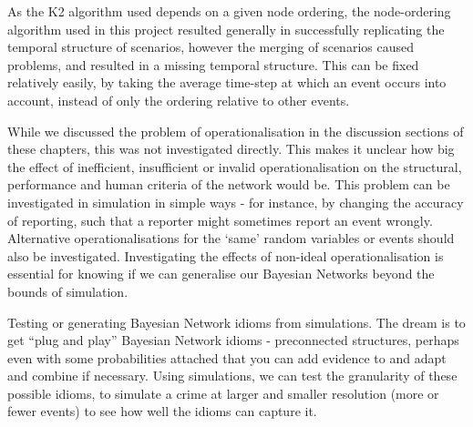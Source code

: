 As the K2 algorithm used depends on a given node ordering, the node-ordering algorithm used in this project resulted generally in successfully replicating the temporal structure of scenarios, however the merging of scenarios caused problems, and resulted in a missing temporal structure. This can be fixed relatively easily, by taking the average time-step at which an event occurs into account, instead of only the ordering relative to other events.

While we discussed the problem of operationalisation in the discussion sections of these chapters, this was not investigated directly. This makes it unclear how big the effect of inefficient, insufficient or invalid operationalisation on the structural, performance and human criteria of the network would be. This problem can be investigated in simulation in simple ways - for instance, by changing the accuracy of reporting, such that a reporter might sometimes report an event wrongly. Alternative operationalisations for the `same' random variables or events should also be investigated. Investigating the effects of non-ideal operationalisation is essential for knowing if we can generalise our Bayesian Networks beyond the bounds of simulation.

Testing or generating Bayesian Network idioms from simulations. The dream is to get ``plug and play'' Bayesian Network idioms - preconnected structures, perhaps even with some probabilities attached that you can add evidence to and adapt and combine if necessary. Using simulations, we can test the granularity of these possible idioms, to simulate a crime at larger and smaller resolution (more or fewer events) to see how well the idioms can capture it.

